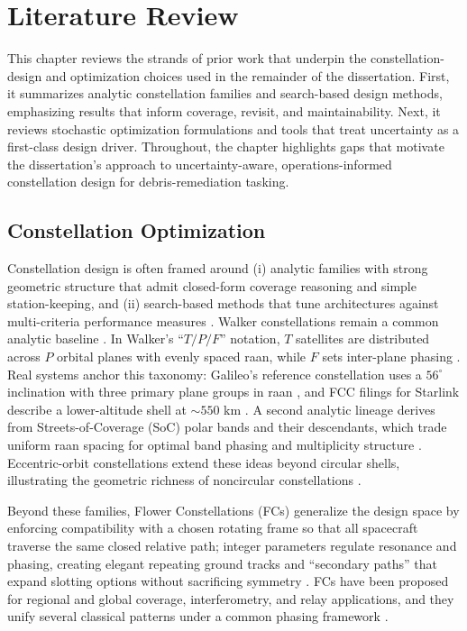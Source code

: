 \chapter{Literature Review} \label{ch:litreview}
    This chapter reviews the strands of prior work that underpin the constellation-design and optimization choices used in the remainder of the dissertation. First, it summarizes analytic constellation families and search-based design methods, emphasizing results that inform coverage, revisit, and maintainability. Next, it reviews stochastic optimization formulations and tools that treat uncertainty as a first-class design driver. Throughout, the chapter highlights gaps that motivate the dissertation's approach to uncertainty-aware, operations-informed constellation design for debris-remediation tasking.
    \section{Constellation Optimization} \label{se:consteloptim}
    
    Constellation design is often framed around (i) analytic families with strong geometric structure that admit closed-form coverage reasoning and simple station-keeping, and (ii) search-based methods that tune architectures against multi-criteria performance measures \cite{lang1998comp}. Walker constellations remain a common analytic baseline \cite{walker1984,Walker1985,lang1998comp}. In Walker's ``\(T/P/F\)'' notation, \(T\) satellites are distributed across \(P\) orbital planes with evenly spaced \gls{raan}, while \(F\) sets inter-plane phasing \cite{lang1998comp}. Real systems anchor this taxonomy: Galileo's reference constellation uses a \(56^{\circ}\) inclination with three primary plane groups in \gls{raan} \cite{GalileoSISICD2025}, and FCC filings for Starlink describe a lower-altitude shell at \(\sim\!550\) km \cite{fcc2018starlinkmod}. A second analytic lineage derives from Streets-of-Coverage (SoC) polar bands and their descendants, which trade uniform \gls{raan} spacing for optimal band phasing and multiplicity structure \cite{lang1998comp}. Eccentric-orbit constellations extend these ideas beyond circular shells, illustrating the geometric richness of noncircular constellations \cite{lang1998comp}.
    
    Beyond these families, Flower Constellations (FCs) generalize the design space by enforcing compatibility with a chosen rotating frame so that all spacecraft traverse the same closed relative path; integer parameters regulate resonance and phasing, creating elegant repeating ground tracks and ``secondary paths'' that expand slotting options without sacrificing symmetry \cite{mortari2004,wilkins2008partI,wilkins2008partII,mortari2006acta}. FCs have been proposed for regional and global coverage, interferometry, and relay applications, and they unify several classical patterns under a common phasing framework \cite{mortari2004,mortari2006acta}.
    
